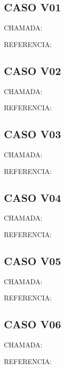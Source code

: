 \documentclass{undftex}
\begin{document}
\begin{refsection}\section*{CASO V01}\noindent CHAMADA:  \par\noindent REFERENCIA:\par\printbibliography[heading=none,check=undfconsultadas]\end{refsection}\clearpage
\begin{refsection}\section*{CASO V02}\noindent CHAMADA:  \par\noindent REFERENCIA:\par\printbibliography[heading=none,check=undfconsultadas]\end{refsection}\clearpage
\begin{refsection}\section*{CASO V03}\noindent CHAMADA:  \par\noindent REFERENCIA:\par\printbibliography[heading=none,check=undfconsultadas]\end{refsection}\clearpage
\begin{refsection}\section*{CASO V04}\noindent CHAMADA:  \par\noindent REFERENCIA:\par\printbibliography[heading=none,check=undfconsultadas]\end{refsection}\clearpage
\begin{refsection}\section*{CASO V05}\noindent CHAMADA:  \par\noindent REFERENCIA:\par\printbibliography[heading=none,check=undfconsultadas]\end{refsection}\clearpage
\begin{refsection}\section*{CASO V06}\noindent CHAMADA:  \par\noindent REFERENCIA:\par\printbibliography[heading=none,check=undfconsultadas]\end{refsection}\clearpage
\end{document}
